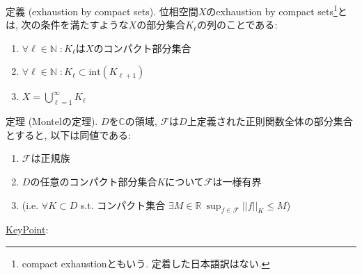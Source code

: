 \documentclass{jsarticle}
\newcommand{\N}{\mathbb{N}}%
\newcommand{\R}{\mathbb{R}}%
\newcommand{\C}{\mathbb{C}}%
\begin{document}
\begin{Def}{定義 (exhaustion by compact sets).}
位相空間$X$のexhaustion by compact sets\footnote{compact exhaustionともいう. 定着した日本語訳はない.}とは, 次の条件を満たすような$X$の部分集合$K_\ell$の列のことである$\colon$
\begin{enumerate}
\item[(i)] $\forall \ell\in\N\;\colon K_\ell$は$X$のコンパクト部分集合
\item[(ii)] $\forall \ell\in\N\; \colon K_\ell\subset \text{int}(K_{\ell+1})$
\item[(iii)] $X=\bigcup_{\ell=1}^{\infty} K_\ell$
\end{enumerate}

\end{Def}

\begin{thm}{定理 (Montelの定理).}
$D$を$\C$の領域, $\mathcal{F}$は$D$上定義された正則関数全体の部分集合とすると, 以下は同値である$\colon$
\begin{enumerate}
\item[(i)]$\mathcal{F}$は正規族
\item[(ii)]$D$の任意のコンパクト部分集合$K$について$\mathcal{F}$は一様有界
\item[](i.e. $\forall K\subset D$ s.t. コンパクト集合 $\exists M\in\R\:\sup_{f\in\mathcal{F}}||f||_K\le M$)
\end{enumerate}
\end{thm}
\uline{Key\;Point}$\colon$
\end{document}
